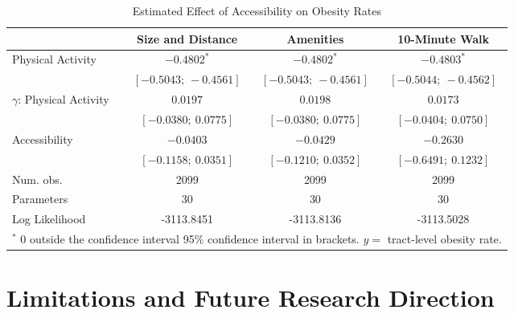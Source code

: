 \documentclass[shortAfour,sageh.bst]{sagej}
\begin{document}
\begin{table*}
\caption{Estimated Effect of Accessibility on Obesity Rates}
\label{tab:obesity-models}

\begin{tabular}{l c c c }
\toprule
 & Size and Distance & Amenities & 10-Minute Walk \\
\midrule
Physical Activity           & $-0.4802^{*}$         & $-0.4802^{*}$         & $-0.4803^{*}$         \\
                            & $[-0.5043;\ -0.4561]$ & $[-0.5043;\ -0.4561]$ & $[-0.5044;\ -0.4562]$ \\
$\gamma$: Physical Activity & $0.0197$              & $0.0198$              & $0.0173$              \\
                            & $[-0.0380;\ 0.0775]$  & $[-0.0380;\ 0.0775]$  & $[-0.0404;\ 0.0750]$  \\
Accessibility               & $-0.0403$             & $-0.0429$             & $-0.2630$             \\
                            & $[-0.1158;\ 0.0351]$  & $[-0.1210;\ 0.0352]$  & $[-0.6491;\ 0.1232]$  \\
\midrule
Num. obs.                   & 2099                  & 2099                  & 2099                  \\
Parameters                  & 30                    & 30                    & 30                    \\
Log Likelihood              & -3113.8451            & -3113.8136            & -3113.5028            \\
\bottomrule
\multicolumn{4}{l}{\scriptsize{$^*$ 0 outside the confidence interval 95\% confidence interval in brackets.  $y = $ tract-level obesity rate.}}
\end{tabular}
\end{table*}

\hypertarget{limitations-and-future-research-direction}{%
\section{Limitations and Future Research
Direction}\label{limitations-and-future-research-direction}}
\end{document}
